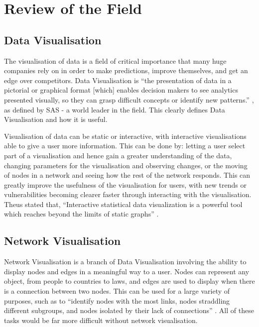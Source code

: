 \documentclass[../dissertation.tex]{subfiles}
\begin{document}
\chapter{Review of the Field}

\section{Data Visualisation}

The visualisation of data is a field of critical importance that many huge companies rely on in order to make predictions, improve themselves, and get an edge over competitors. Data Visualisation is ``the presentation of data in a pictorial or graphical format [which] enables decision makers to see analytics presented visually, so they can grasp difficult concepts or identify new patterns.'' \cite{sasdv}, as defined by SAS - a world leader in the field. This clearly defines Data Visualisation and how it is useful.

Visualisation of data can be static or interactive, with interactive visualisations able to give a user more information. This can be done by: letting a user select part of a visualisation and hence gain a greater understanding of the data, changing parameters for the visualisation and observing changes, or the moving of nodes in a network and seeing how the rest of the network responds. This can greatly improve the usefulness of the visualisation for users, with new trends or vulnerabilities becoming clearer faster through interacting with the visualisation. Theus stated that, ``Interactive statistical data visualization is a powerful tool which reaches beyond the limits of static graphs'' \cite{theus2002interactive}.

\section{Network Visualisation}

Network Visualisation is a branch of Data Visualisation involving the ability to display nodes and edges in a meaningful way to a user. Nodes can represent any object, from people to countries to laws, and edges are used to display when there is a connection between two nodes. This can be used for a large variety of purposes, such as to ``identify nodes with the most links, nodes straddling different subgroups, and nodes isolated by their lack of connections'' \cite{flowingdata}. All of these tasks would be far more difficult without network visualisation.
\end{document}
